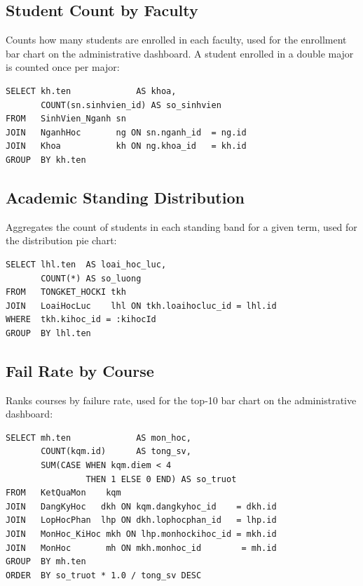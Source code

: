 \documentclass[12pt,a4paper]{report}
\begin{document}
\subsection{Student Count by Faculty}

Counts how many students are enrolled in each faculty, used for the enrollment bar chart on the administrative dashboard. A student enrolled in a double major is counted once per major:

\begin{verbatim}
SELECT kh.ten             AS khoa,
       COUNT(sn.sinhvien_id) AS so_sinhvien
FROM   SinhVien_Nganh sn
JOIN   NganhHoc       ng ON sn.nganh_id  = ng.id
JOIN   Khoa           kh ON ng.khoa_id   = kh.id
GROUP  BY kh.ten
\end{verbatim}

\subsection{Academic Standing Distribution}

Aggregates the count of students in each standing band for a given term, used for the distribution pie chart:

\begin{verbatim}
SELECT lhl.ten  AS loai_hoc_luc,
       COUNT(*) AS so_luong
FROM   TONGKET_HOCKI tkh
JOIN   LoaiHocLuc    lhl ON tkh.loaihocluc_id = lhl.id
WHERE  tkh.kihoc_id = :kihocId
GROUP  BY lhl.ten
\end{verbatim}

\subsection{Fail Rate by Course}

Ranks courses by failure rate, used for the top-10 bar chart on the administrative dashboard:

\begin{verbatim}
SELECT mh.ten             AS mon_hoc,
       COUNT(kqm.id)      AS tong_sv,
       SUM(CASE WHEN kqm.diem < 4
                THEN 1 ELSE 0 END) AS so_truot
FROM   KetQuaMon    kqm
JOIN   DangKyHoc   dkh ON kqm.dangkyhoc_id    = dkh.id
JOIN   LopHocPhan  lhp ON dkh.lophocphan_id   = lhp.id
JOIN   MonHoc_KiHoc mkh ON lhp.monhockihoc_id = mkh.id
JOIN   MonHoc       mh ON mkh.monhoc_id        = mh.id
GROUP  BY mh.ten
ORDER  BY so_truot * 1.0 / tong_sv DESC
\end{verbatim}

\end{document}

